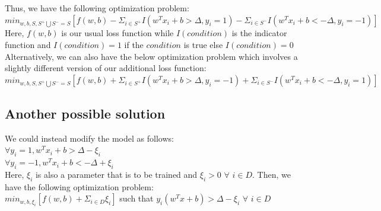 \documentclass[11pt, twosides]{article}
\begin{document}
Thus, we have the following optimization problem:\\

$min_{w, b, S, S^{+}\bigcup S^{-} = S} [f(w, b) - \Sigma_{i \in S^+}I(w^Tx_i + b > \Delta, y_i = 1) - \Sigma_{i \in S^-}I(w^Tx_i + b < -\Delta, y_i = -1)]$\\

Here, $f(w, b)$ is our usual loss function while $I(condition)$ is the indicator function and $I(condition) = 1$ if the $condition$ is true else $I(condition) = 0$\\

Alternatively, we can also have the below optimization problem which involves a slightly different version of our additional loss function:\\

$min_{w, b, S, S^{+}\bigcup S^{-} = S} [f(w, b) + \Sigma_{i \in S^+}I(w^Tx_i + b > \Delta, y_i = -1) + \Sigma_{i \in S^-}I(w^Tx_i + b < -\Delta, y_i = 1)]$\\
\subsection{Another possible solution}

We could instead modify the model as follows:\\

$\forall y_i = 1, w^Tx_i + b > \Delta - \xi_i$\\
$\forall y_i = -1, w^Tx_i + b < -\Delta + \xi_i$\\

Here, $\xi_i$ is also a parameter that is to be trained and $\xi_i > 0$ $\forall$ $i \in D$. Then, we have the following optimization problem:\\

$min_{w, b, \xi_i} [f(w, b) + \Sigma_{i \in D}\xi_i]$ such that $y_i(w^Tx + b) > \Delta - \xi_i$ $\forall$ $i \in D$



\end{document}
